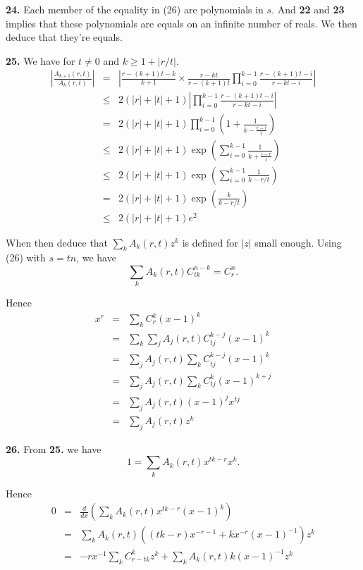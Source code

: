 \documentclass[a4paper,12pt]{article}
\newcommand{\newpar}[1]{\bigskip \noindent \textbf{#1.}}
\begin{document}
\newpar{24} Each member of the equality in (26) are polynomials in
$s$.  And \textbf{22} and \textbf{23} implies that these polynomials
are equals on an infinite number of reals.  We then deduce that
they're equals.

\newpar{25} We have for $t \not= 0$ and $k \ge 1 + |r/t|$.
\begin{eqnarray*}
  \left| \frac{A_{k+1}(r,t)}{A_k(r,t)} \right| &=&
  \left| \frac{r-(k+1)t - k}{k+1}\times \frac{r-kt}{r-(k+1)t} \prod_{i=0}^{k-1}
  \frac{r - (k+1)t - i}{r - kt - i}\right| \\
  &\le& 2(|r|+|t|+1) \left| \prod_{i=0}^{k-1} \frac{r - (k+1)t - i}{r - kt
    - i}\right| \\
  &=& 2(|r|+|t|+1) \prod_{i=0}^{k-1} \left( 1 +
  \frac{1}{k-\frac{r-i}{t}}\right) \\
  &\le& 2(|r| + |t| + 1) \exp\left( \sum_{i=0}^{k-1}
  \frac{1}{k+\frac{i-r}{t}} \right) \\
  &\le& 2(|r| + |t| + 1) \exp\left( \sum_{i=0}^{k-1} \frac{1}{k - r/t}
  \right) \\
  &=& 2(|r| + |t| + 1) \exp\left( \frac{k}{k - r/t} \right) \\
  &\le& 2(|r| + |t| + 1) e^2
\end{eqnarray*}

When then deduce that $\sum_k A_k(r,t) z^k$ is defined for $|z|$ small
enough.  Using (26) with $s = tn$, we have
\[ \sum_k A_k(r,t) C_{tk}^{n-k} = C_r^n.\]

Hence
\begin{eqnarray*}
  x^r &=& \sum_k C_r^k (x-1)^k \\
  &=& \sum_k \sum_j A_j(r,t) C_{tj}^{k-j} (x-1)^k \\
  &=& \sum_j A_j(r,t) \sum_k C_{tj}^{k-j} (x-1)^k \\
  &=& \sum_j A_j(r,t) \sum_k C_{tj}^k (x-1)^{k+j} \\
  &=& \sum_j A_j(r,t) (x-1)^j x^{tj} \\
  &=& \sum_j A_j(r,t) z^k
\end{eqnarray*}

\newpar{26} From \textbf{25.} we have
\[ 1 = \sum_k A_k(r,t) x^{tk-r}x^k.\]

Hence
\begin{eqnarray*}
  0 &=& \frac{d}{dx} \left( \sum_k A_k(r,t) x^{tk-r}(x-1)^k \right) \\
  &=& \sum_k A_k(r,t) ((tk-r) x^{-r-1} + k x^{-r}(x-1)^{-1}) z^k \\
  &=& - r x^{-1} \sum_k C_{r-tk}^k z^k + \sum_k A_k(r,t) k
  (x-1)^{-1} z^k \\
\end{eqnarray*}
\end{document}
